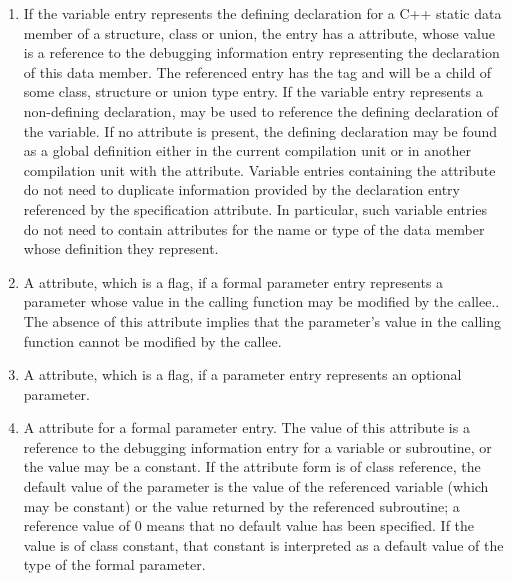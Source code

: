 \begin{enumerate}[1.]
\item If the variable entry represents the defining declaration
for a C++ static data member of a structure, class or union,
the entry has a  attribute, whose value is a
reference to the debugging information entry representing the
declaration of this data member. The referenced entry has the
tag  and will be a child of some class, structure
or union type entry.  If the variable entry represents a
non-defining declaration,  may be used
to reference the defining declaration of the variable. If
no  attribute is present, the defining
declaration may be found as a global definition either in the
current compilation unit or in another compilation unit with
the  attribute.  Variable entries containing
the  attribute do not need to duplicate
information provided by the declaration entry referenced by
the specification attribute. In particular, such variable
entries do not need to contain attributes for the name or
type of the data member whose definition they represent.

\item A  attribute, which is a flag,
if a formal parameter entry represents a parameter whose
value in the calling function may be modified by the callee..
The absence of this attribute implies that the parameter’s
value in the calling function cannot be modified by the callee.

\item A  attribute, which is a flag, if a
parameter entry represents an optional parameter.

\item A  attribute for a formal parameter
entry. The value of this attribute is a reference to the
debugging information entry for a variable or subroutine,
or the value may be a constant. If the attribute form is of
class reference, the default value of the parameter is the
value of the referenced variable (which may be constant) or
the value returned by the referenced subroutine; a reference
value of 0 means that no default value has been specified.
If the value is of class constant, that constant is interpreted
as a default value of the type of the formal parameter.


\end{enumerate}
